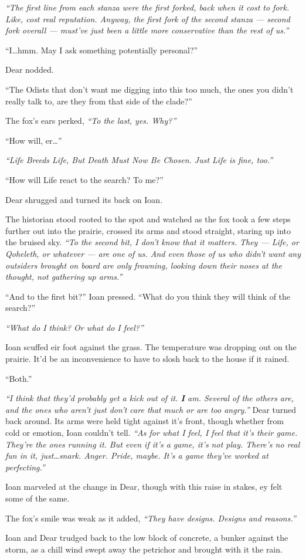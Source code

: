 \emph{``The first line from each stanza were the first forked, back when it cost to fork. Like, cost real reputation. Anyway, the first fork of the second stanza — second fork overall — must've just been a little more conservative than the rest of us.''}

``I\ldots{}hmm. May I ask something potentially personal?''

Dear nodded.

``The Odists that don't want me digging into this too much, the ones you didn't really talk to, are they from that side of the clade?''

The fox's ears perked, \emph{``To the last, yes. Why?''}

``How will, er\ldots{}''

\emph{``Life Breeds Life, But Death Must Now Be Chosen. Just Life is fine, too.''}

``How will Life react to the search? To me?''

Dear shrugged and turned its back on Ioan.

The historian stood rooted to the spot and watched as the fox took a few steps further out into the prairie, crossed its arms and stood straight, staring up into the bruised sky. \emph{``To the second bit, I don't know that it matters. They — Life, or Qoheleth, or whatever — are one of us. And even those of us who didn't want any outsiders brought on board are only frowning, looking down their noses at the thought, not gathering up arms.''}

``And to the first bit?'' Ioan pressed. ``What do you think they will think of the search?''

\emph{``What do I think? Or what do I feel?''}

Ioan scuffed eir foot against the grass. The temperature was dropping out on the prairie. It'd be an inconvenience to have to slosh back to the house if it rained.

``Both.''

\emph{``I think that they'd probably get a kick out of it. \textbf{I} am. Several of the others are, and the ones who aren't just don't care that much or are too angry.''} Dear turned back around. Its arms were held tight against it's front, though whether from cold or emotion, Ioan couldn't tell. \emph{``As for what I feel, I feel that it's their game. They're the ones running it. But even if it's a game, it's not play. There's no real fun in it, just\ldots{}snark. Anger. Pride, maybe. It's a game they've worked at perfecting.''}

Ioan marveled at the change in Dear, though with this raise in stakes, ey felt some of the same.

The fox's smile was weak as it added, \emph{``They have designs. Designs and reasons.''}

Ioan and Dear trudged back to the low block of concrete, a bunker against the storm, as a chill wind swept away the petrichor and brought with it the rain.
